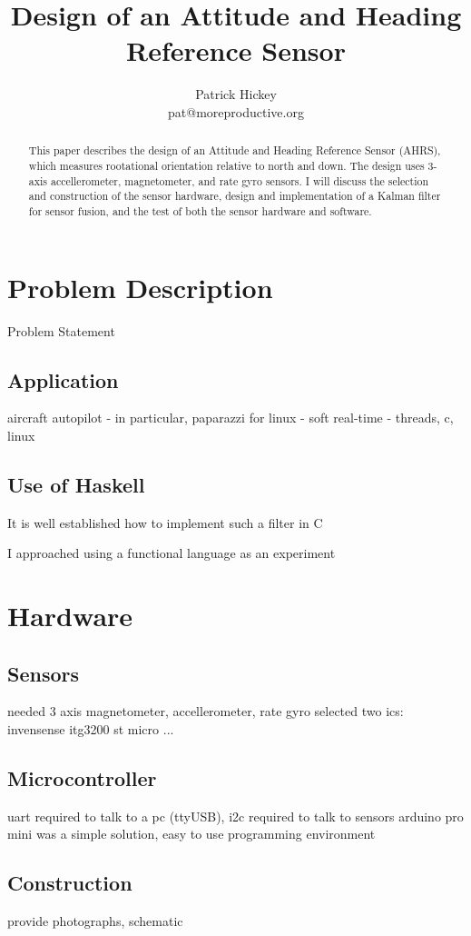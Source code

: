 \documentclass[12pt]{report}
\begin{document}
%
\title{Design of an Attitude and Heading Reference Sensor}
\author{Patrick Hickey\\pat@moreproductive.org}


\begin{abstract}
This paper describes the design of an Attitude and Heading Reference Sensor (AHRS), which measures rootational orientation relative to north and down. 
The design uses 3-axis accellerometer, magnetometer, and rate gyro sensors. 
I will discuss the selection and construction of the sensor hardware, design and implementation of a Kalman filter for sensor fusion, and the test of both the sensor hardware and software.
\end{abstract}


\section{Problem Description}
Problem Statement
\subsection{Application}
aircraft autopilot
- in particular, paparazzi for linux
- soft real-time
- threads, c, linux
\subsection{Use of Haskell}
It is well established how to implement such a filter in C

I approached using a functional language as an experiment

\section{Hardware}
\subsection{Sensors}
needed 3 axis magnetometer, accellerometer, rate gyro
selected two ics:
invensense itg3200
st micro ...
\subsection{Microcontroller}
uart required to talk to a pc (ttyUSB), i2c required to talk to sensors
arduino pro mini was a simple solution, easy to use programming environment
\subsection{Construction}
provide photographs, schematic
\end{document}
